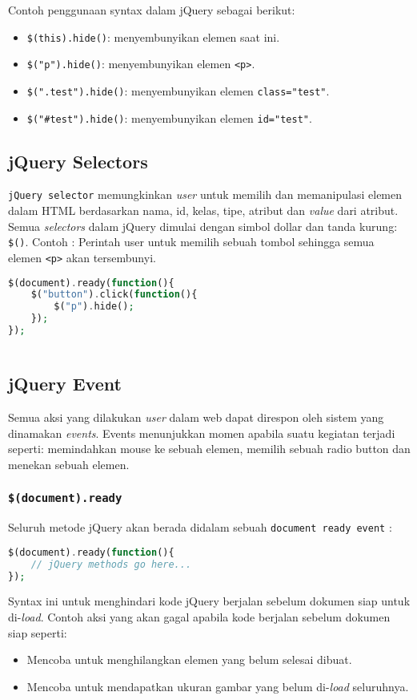 Contoh penggunaan syntax dalam jQuery sebagai berikut:
\begin{itemize}
	\item \texttt{\$(this).hide()}: menyembunyikan elemen saat ini.
	\item \texttt{\$("p").hide()}: menyembunyikan elemen \texttt{<p>}.
	\item \texttt{\$(".test").hide()}: menyembunyikan elemen \texttt{class="test"}.
	\item \texttt{\$("\#test").hide()}: menyembunyikan elemen \texttt{id="test"}.
\end{itemize}
\subsection{jQuery Selectors}
\texttt{jQuery selector} memungkinkan \textit{user} untuk memilih dan memanipulasi elemen dalam HTML berdasarkan nama, id, kelas, tipe, atribut dan \textit{value} dari atribut. Semua \textit{selectors} dalam jQuery dimulai dengan simbol dollar dan tanda kurung: \texttt{\$()}.
Contoh :
Perintah user untuk memilih sebuah tombol sehingga semua elemen \texttt{<p>} akan tersembunyi.
\begin{lstlisting}[frame=single, language=PHP]	
$(document).ready(function(){
	$("button").click(function(){
		$("p").hide();
	});
});
	
\end{lstlisting}

\subsection{jQuery Event}
Semua aksi yang dilakukan \textit{user} dalam web dapat direspon oleh sistem yang dinamakan \textit{events}. Events menunjukkan momen apabila suatu kegiatan terjadi seperti: memindahkan mouse ke sebuah elemen, memilih sebuah radio button dan menekan sebuah elemen.

\subsubsection{\texttt{\$(document).ready}}
Seluruh metode jQuery akan berada didalam sebuah \texttt{document ready event} :
\begin{lstlisting}[frame=single, language=PHP]
$(document).ready(function(){
	// jQuery methods go here...
});
\end{lstlisting}

Syntax ini untuk menghindari kode jQuery berjalan sebelum dokumen siap untuk di-\textit{load}. Contoh aksi yang akan gagal apabila kode berjalan sebelum dokumen siap seperti:
\begin{itemize}
	\item Mencoba untuk menghilangkan elemen yang belum selesai dibuat.
	\item Mencoba untuk mendapatkan ukuran gambar yang belum di-\textit{load} seluruhnya.
\end{itemize}


